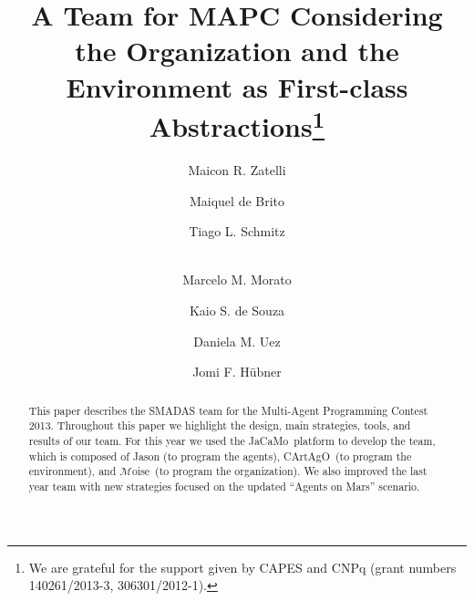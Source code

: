 \documentclass{llncs}
\newcommand{\jacamo}{\textsf{\small JaCaMo}\xspace}
\newcommand{\moise}{$\mathcal{M}$\textsf{\small oise}\xspace}
\newcommand{\cartago}{\textsf{\small CArtAgO}\xspace}
\begin{document}
\title{A Team for MAPC Considering the Organization and the Environment as First-class Abstractions\thanks{We are grateful for the support given by CAPES and CNPq (grant numbers 140261/2013-3, 306301/2012-1).}}
\author{Maicon R. Zatelli \and 
		Maiquel de Brito \and 
		Tiago L. Schmitz \and \\
		Marcelo M. Morato \and
		Kaio S. de Souza \and 
		Daniela M. Uez \and 
		Jomi F. H\"{u}bner }


\maketitle
\begin{abstract} 
This paper describes the SMADAS team for the Multi-Agent Programming Contest 2013. Throughout this paper we highlight the design, main strategies, tools, and results of our team. For this year we used the \jacamo\ platform to develop the team, which is composed of Jason (to program the agents), \cartago\ (to program the environment), and \moise\ (to program the organization). We also improved the last year team with new strategies focused on the updated ``Agents on Mars'' scenario.
\end{abstract}

 		


 
%  
 	




 
\end{document}
